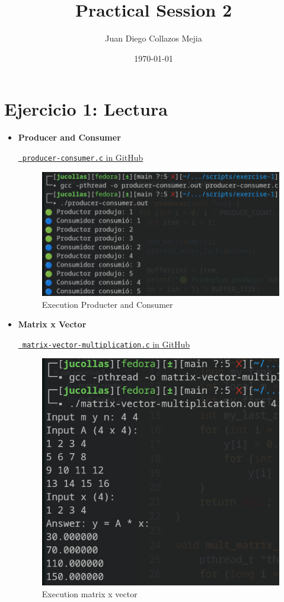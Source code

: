 \documentclass[12pt]{article}
\title{Practical Session 2}
\author{Juan Diego Collazos Mejia}
\date{\today}
\begin{document}
\maketitle

\section*{Ejercicio 1: Lectura}

\begin{itemize}
    \item \textbf{Producer and Consumer}
    \begin{center}
        \href{https://github.com/jucollas/parallel-programming/blob/main/practical-session-2/scripts/exercise-1/producer-consumer.c}{\faGithub\ \texttt{producer-consumer.c} in GitHub}
    \end{center}
    \begin{figure}[H]
        \centering
        \includegraphics[width=0.47\linewidth]{images/execution-producter-consumer.png}
        \caption{Execution Producter and Consumer}
        \label{fig:os}
    \end{figure}

    \item \textbf{Matrix x Vector}
    \begin{center}
        \href{https://github.com/jucollas/parallel-programming/blob/main/practical-session-2/scripts/exercise-1/matrix-vector-multiplication.c}{\faGithub\ \texttt{matrix-vector-multiplication.c} in GitHub}
    \end{center}
    \begin{figure}[H]
        \centering
        \includegraphics[width=0.37\linewidth]{images/execution-matrix-vector-mult.png}
        \caption{Execution matrix x vector}
        \label{fig:os}
    \end{figure}


\end{itemize}
\end{document}

